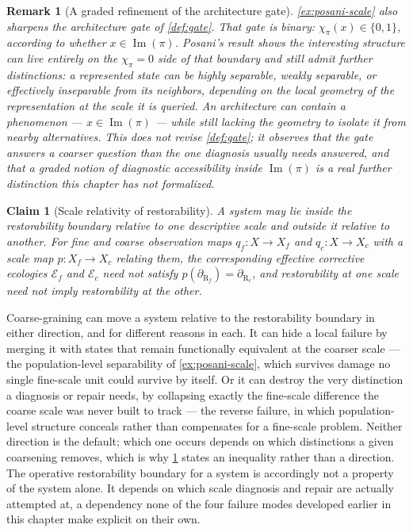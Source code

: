 \documentclass[12pt]{report}
\newtheorem{claim}[definition]{Claim}
\newtheorem{remark}[definition]{Remark}
\newcommand{\Rboundary}[1][]{\ensuremath{\partial_{\mathrm{R}#1}}}
\begin{document}
\begin{remark}[A graded refinement of the architecture gate]
\label{rem:graded-gate}
\cref{ex:posani-scale} also sharpens the architecture gate of
\cref{def:gate}. That gate is binary: $\chi_\pi(x) \in \{0,1\}$,
according to whether $x \in \operatorname{Im}(\pi)$. Posani's result
shows the interesting structure can live entirely on the $\chi_\pi = 0$
side of that boundary and still admit further distinctions: a
represented state can be highly separable, weakly separable, or
effectively inseparable from its neighbors, depending on the local
geometry of the representation at the scale it is queried. An
architecture can contain a phenomenon --- $x \in \operatorname{Im}(\pi)$
--- while still lacking the geometry to isolate it from nearby
alternatives. This does not revise \cref{def:gate}; it observes that the
gate answers a coarser question than the one diagnosis usually needs
answered, and that a graded notion of diagnostic accessibility inside
$\operatorname{Im}(\pi)$ is a real further distinction this chapter has
not formalized.
\end{remark}

\begin{claim}[Scale relativity of restorability]
\label{claim:scale-restorability}
A system may lie inside the restorability boundary relative to one
descriptive scale and outside it relative to another. For fine and
coarse observation maps $q_f : X \to X_f$ and $q_c : X \to X_c$ with a
scale map $p : X_f \to X_c$ relating them, the corresponding effective
corrective ecologies $\mathcal{E}_f$ and $\mathcal{E}_c$ need not
satisfy $p(\Rboundary[_f]) = \Rboundary[_c]$, and restorability at one
scale need not imply restorability at the other.
\end{claim}

Coarse-graining can move a system relative to the restorability boundary
in either direction, and for different reasons in each. It can hide a
local failure by merging it with states that remain functionally
equivalent at the coarser scale --- the population-level separability of
\cref{ex:posani-scale}, which survives damage no single fine-scale unit
could survive by itself. Or it can destroy the very distinction a
diagnosis or repair needs, by collapsing exactly the fine-scale
difference the coarse scale was never built to track --- the reverse
failure, in which population-level structure conceals rather than
compensates for a fine-scale problem. Neither direction is the default;
which one occurs depends on which distinctions a given coarsening
removes, which is why \cref{claim:scale-restorability} states an
inequality rather than a direction. The operative restorability boundary
for a system is accordingly not a property of the system alone. It
depends on which scale diagnosis and repair are actually attempted at,
a dependency none of the four failure modes developed earlier in this
chapter make explicit on their own.
\end{document}
